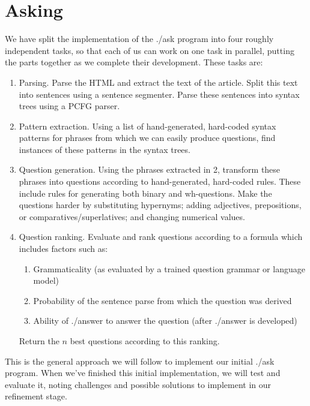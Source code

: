 \documentclass{article}
\begin{document}
\section{Asking}
We have split the implementation of the ./ask program into four roughly independent tasks, so that each of us can work on one task in parallel, putting the parts together as we complete their development. These tasks are:
\begin{enumerate}
  \item Parsing. Parse the HTML and extract the text of the article. Split this text into sentences using a sentence segmenter. Parse these sentences into syntax trees using a PCFG parser.
  \item Pattern extraction. Using a list of hand-generated, hard-coded syntax patterns for phrases from which we can easily produce questions, find instances of these patterns in the syntax trees.
  \item Question generation. Using the phrases extracted in 2, transform these phrases into questions according to hand-generated, hard-coded rules. These include rules for generating both binary and wh-questions. Make the questions harder by substituting hypernyms; adding adjectives, prepositions, or comparatives/superlatives; and changing numerical values.
  \item Question ranking. Evaluate and rank questions according to a formula which includes factors such as:
  \begin{enumerate}
    \item Grammaticality (as evaluated by a trained question grammar or language model)
    \item Probability of the sentence parse from which the question was derived
    \item Ability of ./answer to answer the question (after ./answer is developed)
  \end{enumerate}
  Return the $n$ best questions according to this ranking.
\end{enumerate}
This is the general approach we will follow to implement our initial ./ask program. When we’ve finished this initial implementation, we will test and evaluate it, noting challenges and possible solutions to implement in our refinement stage.
\end{document}
